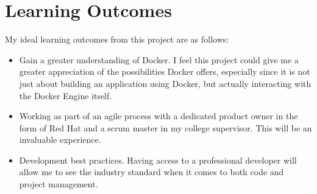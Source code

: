 \documentclass{article}
\begin{document}
\section{Learning Outcomes}
\label{sec:Learning Outcomes}
My ideal learning outcomes from this project are as follows:
\begin{itemize}
	\item Gain a greater understanding of Docker. I feel this project could give me a greater appreciation of the possibilities Docker offers, especially since it is not just about building an application using Docker, but actually interacting with the Docker Engine itself.
	\item Working as part of an agile process with a dedicated product owner in the form of Red Hat and a scrum master in my college supervisor. This will be an invaluable experience.
	\item Development best practices. Having access to a professional developer will allow me to see the industry standard when it comes to both code and project management. 
\end{itemize}
\end{document}
